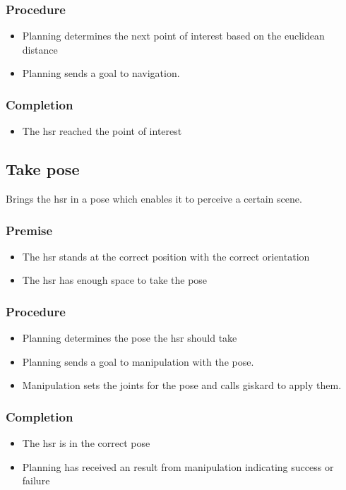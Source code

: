 \documentclass[main.tex]{subfiles}
\begin{document}
	\subsubsection{Procedure}
		\begin{itemize}			
			\item Planning determines the next point of interest based on the euclidean distance
			\item Planning sends a goal to navigation. 				
		\end{itemize}
	
	\subsubsection{Completion}
		\begin{itemize}
			\item The hsr reached the point of interest		
		\end{itemize}
		
	\subsection{Take pose}
	Brings the hsr in a pose which enables it to perceive a certain scene.
	
	\subsubsection{Premise}
	\begin{itemize}
		\item The hsr stands at the correct position with the correct orientation
		\item The hsr has enough space to take the pose  
	\end{itemize} 
	
	\subsubsection{Procedure}
	\begin{itemize}			
		\item Planning determines the pose the hsr should take
		\item Planning sends a goal to manipulation with the pose.
		\item Manipulation sets the joints for the pose and calls giskard to apply them. 				
	\end{itemize}
	
	\subsubsection{Completion}
	\begin{itemize}
		\item The hsr is in the correct pose
		\item Planning has received an result from manipulation indicating success or failure		
	\end{itemize}
	
\end{document}
